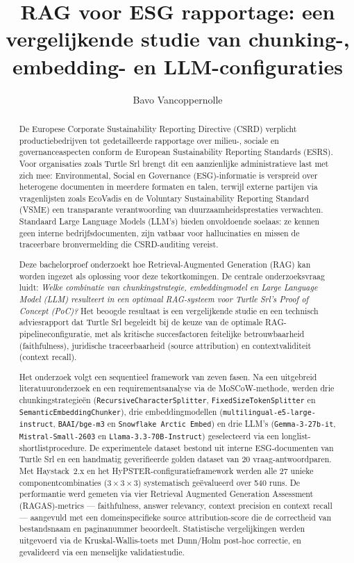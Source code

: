 \documentclass[a0,portrait]{hogent-poster}
\title{RAG voor ESG rapportage: een vergelijkende studie van chunking-, embedding- en LLM-configuraties}
\subtitle{}
\author{Bavo Vancoppernolle}
\begin{document}
\maketitle

\begin{abstract}
De Europese Corporate Sustainability Reporting Directive (CSRD) verplicht productiebedrijven tot gedetailleerde rapportage over milieu-, sociale en governanceaspecten conform de European Sustainability Reporting Standards (ESRS). Voor organisaties zoals Turtle Srl brengt dit een aanzienlijke administratieve last met zich mee: Environmental, Social en Governance (ESG)-informatie is verspreid over heterogene documenten in meerdere formaten en talen, terwijl externe partijen via vragenlijsten zoals EcoVadis en de Voluntary Sustainability Reporting Standard (VSME) een transparante verantwoording van duurzaamheidsprestaties verwachten. Standaard Large Language Models (LLM's) bieden onvoldoende soelaas: ze kennen geen interne bedrijfsdocumenten, zijn vatbaar voor hallucinaties en missen de traceerbare bronvermelding die CSRD-auditing vereist.

Deze bachelorproef onderzoekt hoe Retrieval-Augmented Generation (RAG) kan worden ingezet als oplossing voor deze tekortkomingen. De centrale onderzoeksvraag luidt: \textit{Welke combinatie van chunkingstrategie, embeddingmodel en Large Language Model (LLM) resulteert in een optimaal RAG-systeem voor Turtle Srl's Proof of Concept (PoC)?} Het beoogde resultaat is een vergelijkende studie en een technisch adviesrapport dat Turtle Srl begeleidt bij de keuze van de optimale RAG-pipelineconfiguratie, met als kritische succesfactoren feitelijke betrouwbaarheid (faithfulness), juridische traceerbaarheid (source attribution) en contextvaliditeit (context recall).

Het onderzoek volgt een sequentieel framework van zeven fasen. Na een uitgebreid literatuuronderzoek en een requirementsanalyse via de MoSCoW-methode, werden drie chunkingstrategieën (\texttt{RecursiveCharacterSplitter}, \texttt{FixedSizeTokenSplitter} en \texttt{SemanticEmbeddingChunker}), drie embeddingmodellen (\texttt{multilingual-e5-large-instruct}, \texttt{BAAI/bge-m3} en \texttt{Snowflake Arctic Embed}) en drie LLM's (\texttt{Gemma-3-27b-it}, \texttt{Mistral-Small-2603} en \texttt{Llama-3.3-70B-Instruct}) geselecteerd via een longlist-shortlistprocedure. De experimentele dataset bestond uit interne ESG-documenten van Turtle Srl en een handmatig geverifieerde golden dataset van 20 vraag-antwoordparen. Met Haystack~2.x en het HyPSTER-configuratieframework werden alle 27 unieke componentcombinaties ($3 \times 3 \times 3$) systematisch geëvalueerd over 540 runs. De performantie werd gemeten via vier Retrieval Augmented Generation Assessment (RAGAS)-metrics — faithfulness, answer relevancy, context precision en context recall — aangevuld met een domeinspecifieke source attribution-score die de correctheid van bestandsnaam en paginanummer beoordeelt. Statistische vergelijkingen werden uitgevoerd via de Kruskal-Wallis-toets met Dunn/Holm post-hoc correctie, en gevalideerd via een menselijke validatiestudie.


\end{abstract}
\end{document}
